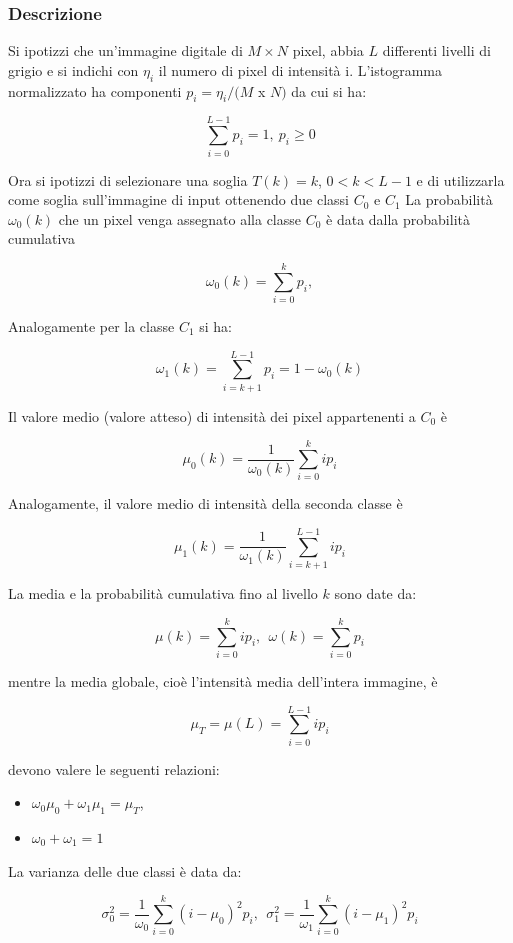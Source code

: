 \subsubsection{Descrizione}

Si ipotizzi che un'immagine digitale di $M \times N$ pixel, abbia $L$ differenti
livelli di grigio e si indichi con $\eta_i$ il numero di pixel di intensità i.
L'istogramma normalizzato ha componenti $p_i = \eta_i/(M$ x $N)$ da cui si ha:

$$
    \sum_{i=0}^{L-1}p_i = 1, \ p_i \ge 0
$$

Ora si ipotizzi di selezionare una soglia $T(k) = k$, $0 < k < L - 1$ e di
utilizzarla come soglia sull'immagine di input ottenendo due classi $C_0$ e
$C_1$ La probabilità $\omega_0(k)$ che un pixel venga assegnato alla classe
$C_0$ è data dalla probabilità cumulativa

$$
    \omega_0(k) = \sum_{i=0}^{k}p_i,
$$

Analogamente per la classe $C_1$ si ha:

$$
    \omega_1(k) = \sum_{i=k+1}^{L-1}p_i=1-\omega_0(k)
$$

Il valore medio (valore atteso) di intensità dei pixel appartenenti a
$C_0$ è

$$
    \mu_0(k)=\frac{1}{\omega_0(k)} \sum_{i=0}^{k}ip_i
$$

Analogamente, il valore medio di intensità della seconda classe è

$$
    \mu_1(k)=\frac{1}{\omega_1(k)}\sum_{i=k+1}^{L-1}ip_i
$$

La media e la probabilità cumulativa fino al livello $k$ sono date da:

$$
    \mu(k)=\sum_{i=0}^{k}ip_i, \ \ \omega(k)=\sum_{i=0}^{k}p_i
$$

mentre la media globale, cioè l'intensità media dell'intera immagine, è

$$
    \mu_T=\mu(L)=\sum_{i=0}^{L-1}ip_i
$$

devono valere le seguenti relazioni:

\begin{itemize}
    \item $\omega_0 \mu_0 + \omega_1 \mu_1 = \mu_T$,
    \item $\omega_0 + \omega_1 = 1$
\end{itemize}

La varianza delle due classi è data da:

$$
    \sigma^2_0 = \frac{1}{\omega_0}\sum_{i=0}^{k}(i-\mu_0)^2p_i, \ \ \sigma^2_1 = \frac{1}{\omega_1}\sum_{i=0}^{k}(i-\mu_1)^2p_i
$$

